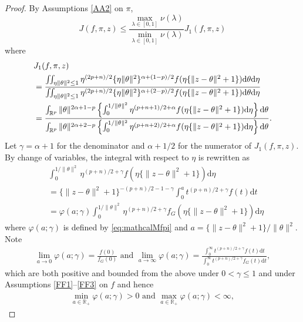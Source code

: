 \documentclass[preprint,11pt]{imsart}
\numberwithin{equation}{section}
\theoremstyle{plain}
\theoremstyle{definition}
\theoremstyle{remark}
\newcommand{\rd}{\mathrm{d}}
\begin{document}
\begin{proof}
 By Assumptions \ref{AA2} on $\pi$,
\begin{equation}\label{MM1}
 J(f,\pi,z)\leq \frac{\max_{\lambda\in[0,1]}\nu(\lambda)}{\min_{\lambda\in[0,1]}\nu(\lambda)}
  J_1(f,\pi,z)
\end{equation}
 where
 \begin{align}
& J_1(f,\pi,z) \label{def:M1}\\
&= \frac{\iint_{\eta\|\theta\|^2\leq 1} 
  \eta^{(2p+n)/2} \{\eta\|\theta\|^2\}^{\alpha+(1-p)/2} f(\eta\{\|z-\theta\|^2+1\}) 
 \rd \theta   \rd \eta}{\iint_{\eta\|\theta\|^2\leq 1}  
  \eta^{(2p+n)/2} \{\eta\|\theta\|^2\}^{\alpha+(2-p)/2} f(\eta\{\|z-\theta\|^2+1\}) 
 \rd \theta   \rd \eta}\notag \\
  &=
  \frac{\int_{\mathbb{R}^p} \|\theta\|^{2\alpha+1-p}
  \left\{\int_0^{1/\|\theta\|^2}\eta^{(p+n+1)/2+\alpha} f(\eta\{\|z-\theta\|^2+1\}) \rd \eta\right\}
  \rd \theta   }
  {\int_{\mathbb{R}^p} \|\theta\|^{2\alpha+2-p}
  \left\{\int_0^{1/\|\theta\|^2}\eta^{(p+n+2)/2+\alpha} f(\eta\{\|z-\theta\|^2+1\}) \rd \eta\right\}
  \rd \theta }.\notag
 \end{align}
 Let $\gamma=\alpha+1$ for the denominator and $\alpha+1/2$ for the numerator
 of $J_1(f,\pi,z)$.
 By change of variables, the integral with respect to $\eta$ is rewritten as
\begin{align*}
& \int_0^{1/\|\theta\|^2} 
  \eta^{(p+n)/2+\gamma} f(\eta\{\|z-\theta\|^2+1\}) 
 \rd \eta \\
& =\{\|z-\theta\|^2+1\}^{-(p+n)/2-1-\gamma}\int_0^a
  t^{(p+n)/2+\gamma} f(t)  \rd t \\
 & =\varphi(a;\gamma)
\int_0^{1/\|\theta\|^2} 
  \eta^{(p+n)/2+\gamma}  f_G(\eta\{\|z-\theta\|^2+1\})  \rd \eta
\end{align*} 
 where $\varphi(a;\gamma)$ is defined by \eqref{eq:mathcalMfpi} and $a=\{\|z-\theta\|^2+1\}/\|\theta\|^2$.
 Note
\begin{align*}
 \lim_{a\to 0}\varphi(a;\gamma)=\frac{f(0)}{f_G(0)}\text{ and }\lim_{a\to \infty}
 \varphi(a;\gamma)=
\frac{\int_0^\infty  t^{(p+n)/2+\gamma} f(t)  \rd t }{\int_0^\infty  t^{(p+n)/2+\gamma} f_G(t)  \rd t },
\end{align*}
 which are both positive and bounded from the above under $0<\gamma\leq 1$ and
 under Assumptions \ref{FF1}--\ref{FF3} on $f$
and hence
 \begin{align*}
  \min_{a\in\mathbb{R}_+}\varphi(a;\gamma)>0
  \text{ and } \max_{a\in\mathbb{R}_+}\varphi(a;\gamma)<\infty,
 \end{align*}

\end{proof}
\end{document}
